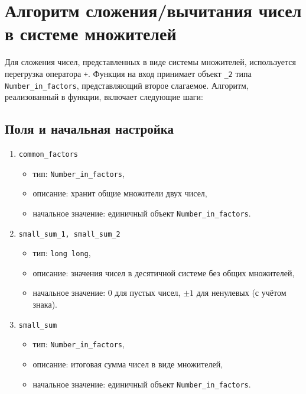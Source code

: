 \section{Алгоритм сложения/вычитания чисел в системе множителей}
Для сложения чисел, представленных в виде системы множителей, используется перегрузка оператора \texttt{+}. Функция на вход принимает объект \texttt{\_2} типа \texttt{Number\_in\_factors}, представляющий второе слагаемое. Алгоритм, реализованный в функции, включает следующие шаги:

\subsection*{Поля и начальная настройка}
\begin{enumerate}
	\item \texttt{common\_factors}
	\begin{itemize}
		\item тип: \texttt{Number\_in\_factors},
		\item описание: хранит общие множители двух чисел,
		\item начальное значение: единичный объект \texttt{Number\_in\_factors}.
	\end{itemize}
	
	\item \texttt{small\_sum\_1, small\_sum\_2}
	\begin{itemize}
		\item тип: \texttt{long long},
		\item описание: значения чисел в десятичной системе без общих множителей,
		\item начальное значение: 0 для пустых чисел, $\pm1$ для ненулевых (с учётом знака).
	\end{itemize}
	
	\item \texttt{small\_sum}
	\begin{itemize}
		\item тип: \texttt{Number\_in\_factors},
		\item описание: итоговая сумма чисел в виде множителей,
		\item начальное значение: единичный объект \texttt{Number\_in\_factors}.
	\end{itemize}
\end{enumerate}

